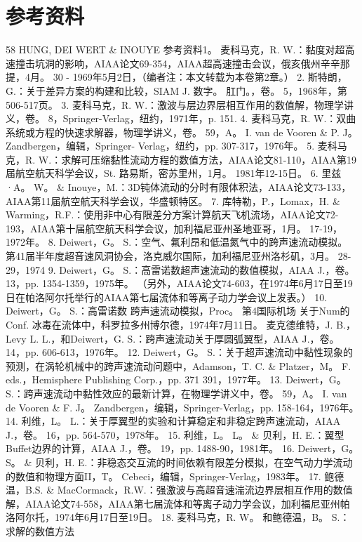 \documentclass[UTF8,11pt,a4paper,openany,fontset=fandol]{ctexbook}
\begin{document}
\section{参考资料}
58 HUNG, DEI WERT \& INOUYE 参考资料1。 麦科马克，R. W.：黏度对超高速撞击坑洞的影响，AIAA论文69-354，AIAA超高速撞击会议，俄亥俄州辛辛那提，4月。 30 - 1969年5月2日，（编者注：本文转载为本卷第2章。） 2. 斯特朗，G.：关于差异方案的构建和比较，SIAM J. 数字。 肛门。，卷。 5，1968年，第506-517页。 3. 麦科马克，R. W.：激波与层边界层相互作用的数值解，物理学讲义，卷。 8，Springer-Verlag，纽约，1971年，p. 151. 4. 麦科马克，R. W.：双曲系统或方程的快速求解器，物理学讲义，卷。 59，A。 I. van de Vooren \& P. J。 Zandbergen，编辑，Springer- Verlag，纽约，pp. 307-317，1976年。 5. 麦科马克，R. W.：求解可压缩黏性流动方程的数值方法，AIAA论文81-110，AIAA第19届航空航天科学会议，St. 路易斯，密苏里州，1月。 1981年12-15日。 6. 里兹·A。 W。 \& Inouye，M.：3D钝体流动的分时有限体积法，AIAA论文73-133，AIAA第11届航空航天科学会议，华盛顿特区。 7. 库特勒，P.，Lomax，H. \& Warming，R.F.：使用非中心有限差分方案计算航天飞机流场，AIAA论文72-193，AIAA第十届航空航天科学会议，加利福尼亚州圣地亚哥，1月。 17-19，1972年。 8. Deiwert，G。 S.：空气、氟利昂和低温氮气中的跨声速流动模拟。 第41届半年度超音速风洞协会，洛克威尔国际，加利福尼亚州洛杉矶，3月。 28-29，1974 9. Deiwert，G。 S.：高雷诺数超声速流动的数值模拟，AIAA J.，卷。 13，pp. 1354-1359，1975年。 （另外，AIAA论文74-603，在1974年6月17日至19日在帕洛阿尔托举行的AIAA第七届流体和等离子动力学会议上发表。） 10. Deiwert，G。 S.：高雷诺数 跨声速流动模拟，Proc。 第4国际机场 关于Num的Conf. 冰毒在流体中，科罗拉多州博尔德，1974年7月11日。 麦克德维特，J. B.，Levy L. L.，和Deiwert，G. S.：跨声速流动关于厚圆弧翼型，AIAA J.，卷。 14，pp. 606-613，1976年。 12. Deiwert，G。 S.：关于超声速流动中黏性现象的预测，在涡轮机械中的跨声速流动问题中，Adamson，T. C. \& Platzer，M。 F. eds.，Hemisphere Publishing Corp.，pp. 371 391，1977年。 13. Deiwert，G。 S.：跨声速流动中黏性效应的最新计算，在物理学讲义中，卷。 59，A。 I. van de Vooren \& F. J。 Zandbergen，编辑，Springer-Verlag，pp. 158-164，1976年。 14. 利维，L。 L.：关于厚翼型的实验和计算稳定和非稳定跨声速流动，AIAA J.，卷。 16，pp. 564-570，1978年。 15. 利维，L。 L。 \& 贝利，H. E.：翼型 Buffet边界的计算，AIAA J.，卷。 19，pp. 1488-90，1981年。 16. Deiwert，G。 S。 \& 贝利，H. E.：非稳态交互流的时间依赖有限差分模拟，在空气动力学流动的数值和物理方面II，T。 Cebeci，编辑，Springer-Verlag，1983年。 17. 鲍德温，B.S. \& MacCormack，R.W.：强激波与高超音速湍流边界层相互作用的数值解，AIAA论文74-558，AIAA第七届流体和等离子动力学会议，加利福尼亚州帕洛阿尔托，1974年6月17日至19日。 18. 麦科马克，R. W。 和鲍德温，B。 S.：求解的数值方法
\end{document}

